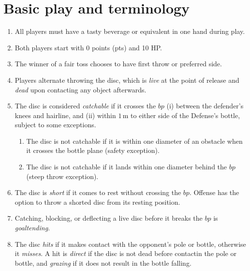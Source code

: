\documentclass[11pt,letterpaper,twocolumn,english,DIV=calc]{scrartcl}
\begin{document}
\section{Basic play and terminology}
\begin{enumerate}
	\item All players must have a tasty beverage or equivalent in one hand during play.
	\item Both players start with 0 points (pts) and 10 HP.
	\item \label{enu:fair_toss} The winner of a fair toss chooses to have first throw or preferred side.
	\item \label{enu:alternate_throws} Players alternate throwing the disc, which is \emph{live} at the point of release and \emph{dead} upon contacting any object afterwards.

	\item The disc is considered \emph{catchable} if it crosses the $bp$ (i) between the defender's knees and hairline, and (ii) within $1\,\mbox{m}$ to either side of the Defense's bottle, subject to some exceptions.
	\begin{enumerate}
		\item The disc is not catchable if it is within one diameter of an obstacle when it crosses the bottle plane (safety exception).
		\item The disc is not catchable if it lands within one diameter behind the $bp$ (steep throw exception).
	\end{enumerate}

	\item The disc is \emph{short} if it comes to rest without crossing the $bp$. 
		Offense has the option to throw a shorted disc from its resting position. 

	\item Catching, blocking, or deflecting a live disc before it breaks the $bp$ is \emph{goaltending}.
	
	\item The disc \emph{hits} if it makes contact with the opponent's pole or bottle, otherwise it \emph{misses}.
	A hit is \emph{direct} if the disc is not dead before contactin the pole or bottle, and \emph{grazing} if it does not result in the bottle falling.

\end{enumerate}
\end{document}
